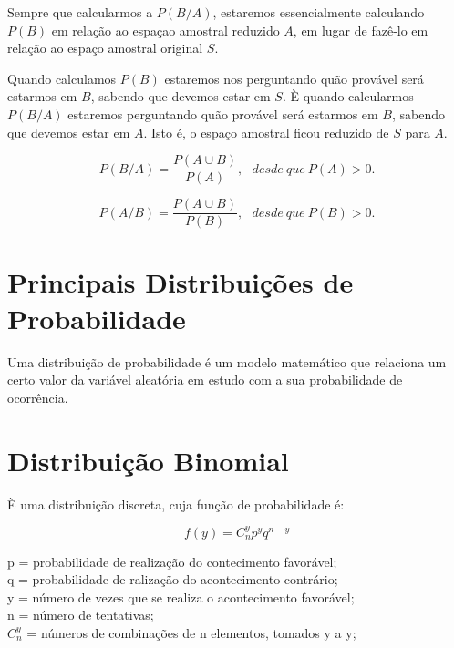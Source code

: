 \inic Sempre que calcularmos a $P(B/A)$, estaremos essencialmente calculando $P(B)$ em relação ao espaçao amostral reduzido $A$, em lugar de fazê-lo em relação ao espaço amostral original $S$.\vskip0.3cm

\inic Quando calculamos $P(B)$ estaremos nos perguntando quão provável será estarmos em $B$, sabendo que devemos estar em $S$. È quando calcularmos $P(B/A)$ estaremos perguntando quão provável será estarmos em $B$, sabendo que devemos estar em $A$. Isto é, o espaço amostral ficou reduzido de $S$ para $A$.

\begin{equation}
    P(B/A)= \frac{P(A \cup B)}{P(A)}, \ \ \ desde \ que \ P(A) > 0.
\end{equation}

\begin{equation}
    P(A/B)= \frac{P(A \cup B)}{P(B)}, \ \ \ desde \ que \ P(B) > 0.
\end{equation}


\newpage
\section{Principais Distribuições de Probabilidade}
 
 
\inic Uma distribuição de probabilidade é um modelo matemático que relaciona um certo valor da variável aleatória em estudo com a sua probabilidade de ocorrência.
 
 \section{Distribuição Binomial}
 
 \inic È uma distribuição discreta, cuja função de probabilidade é:
 
 \begin{equation}
     f(y) = C_{n}^{y}p^{y}q^{n-y}
 \end{equation}
 

 \inic p = probabilidade de realização do contecimento favorável; \\
 \inic q = probabilidade de ralização do acontecimento contrário;  \\
 \inic y = número de vezes que se realiza o acontecimento favorável; \\ 
 \inic n = número de tentativas; \\
 \inic $ C_{n}^{y}$ = números de combinações de n elementos, tomados y a y; 
 
 
